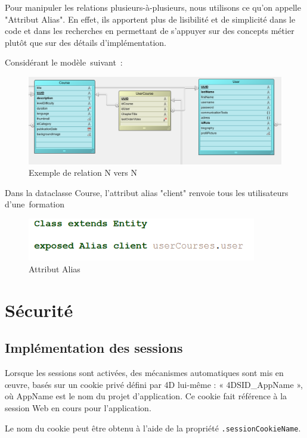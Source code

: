 Pour manipuler les relations plusieurs-à-plusieurs, nous utilisons ce qu’on appelle "Attribut Alias". En effet, ils apportent plus de lisibilité et de simplicité dans le code et dans les recherches en permettant de s’appuyer sur des concepts métier plutôt que sur des détails d’implémentation.

Considérant le modèle suivant :

\begin{figure}[H]
    \centering
\includegraphics[width=19cm]{Figures/exemple.PNG}
    \caption{Exemple de relation N vers N}
\end{figure}

Dans la dataclasse Course, l’attribut alias "client" renvoie tous les utilisateurs d’une formation

\begin{figure}[H]
    \centering
\includegraphics[width=10cm]{Figures/alias.PNG}
    \caption{Attribut Alias}
\end{figure}

\section{Sécurité}

\subsection{Implémentation des sessions}
Lorsque les sessions sont activées, des mécanismes automatiques sont mis en œuvre, basés sur un cookie privé défini par 4D lui-même : « 4DSID\_AppName », où AppName est le nom du projet d'application. Ce cookie fait référence à la session Web en cours pour l'application. 

Le nom du cookie peut être obtenu à l'aide de la propriété \texttt{.sessionCookieName}.



